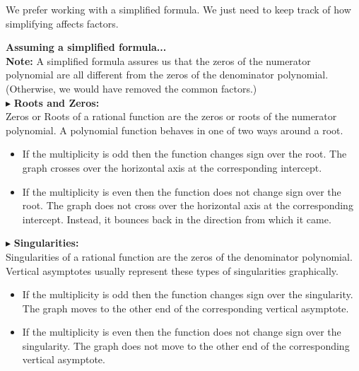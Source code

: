 \documentclass{ximera}
\begin{document}
We prefer working with a simplified formula.  We just need to keep track of how simplifying affects factors.






\textbf{\textcolor{red!80!black}{Assuming a simplified formula...}} \\


\textbf{\textcolor{red!80!black}{Note:}} A simplified formula assures us that the zeros of the numerator polynomial are all different from the zeros of the denominator polynomial. (Otherwise, we would have removed the common factors.) \\





$\blacktriangleright$ \textbf{\textcolor{red!10!blue!90!}{Roots and Zeros:}} \\
   Zeros or Roots of a rational function are the zeros or roots of the numerator polynomial.  A polynomial function behaves in one of two ways around a root.

\begin{itemize}
\item If the multiplicity is odd then the function changes sign over the root.  The graph crosses over the horizontal axis at the corresponding intercept.
\item If the multiplicity is even then the function does not change sign over the root.  The graph does not cross over the horizontal axis at the corresponding intercept. Instead, it bounces back in the direction from which it came.
\end{itemize}






$\blacktriangleright$ \textbf{\textcolor{red!10!blue!90!}{Singularities:}} \\
Singularities of a rational function are the zeros of the denominator polynomial.  Vertical asymptotes usually represent these types of singularities graphically.

\begin{itemize}
\item If the multiplicity is odd then the function changes sign over the singularity.  The graph moves to the other end of the corresponding vertical asymptote.
\item If the multiplicity is even then the function does not change sign over the singularity.  The graph does not move to the other end of the corresponding vertical asymptote. 
\end{itemize}
\end{document}
